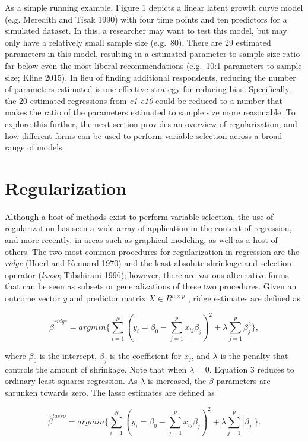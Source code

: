 As a simple running example, Figure 1 depicts a linear latent growth
curve model (e.g. Meredith and Tisak 1990) with four time points and ten
predictors for a simulated dataset. In this, a researcher may want to
test this model, but may only have a relatively small sample size
(e.g.~80). There are 29 estimated parameters in this model, resulting in
a estimated parameter to sample size ratio far below even the most
liberal recommendations (e.g.~10:1 parameters to sample size; Kline
2015). In lieu of finding additional respondents, reducing the number of
parameters estimated is one effective strategy for reducing bias.
Specifically, the 20 estimated regressions from \textit{c1-c10} could be
reduced to a number that makes the ratio of the parameters estimated to
sample size more reasonable. To explore this further, the next section
provides an overview of regularization, and how different forms can be
used to perform variable selection across a broad range of models.

\section{Regularization}\label{regularization}

Although a host of methods exist to perform variable selection, the use
of regularization has seen a wide array of application in the context of
regression, and more recently, in areas such as graphical modeling, as
well as a host of others. The two most common procedures for
regularization in regression are the \textit{ridge} (Hoerl and Kennard
1970) and the least absolute shrinkage and selection operator
(\textit{lasso}; Tibshirani 1996); however, there are various
alternative forms that can be seen as subsets or generalizations of
these two procedures. Given an outcome vector \textit{y} and predictor
matrix \(X \in {R}^{n \times p}\) , ridge estimates are defined as

\[\tag{1}
\hat{\beta}^{ridge}= argmin \Big\{ \sum_{i=1}^{N} (y_{i} = \beta_{0} - \sum_{j=1}^{p}x_{ij} \beta_{j})^{2}  + \lambda \sum_{j=1}^{p} \beta_{j}^{2}\Big\},
\]

where \(\beta_{0}\) is the intercept, \(\beta_{j}\) is the coefficient
for \(x_{j}\), and \(\lambda\) is the penalty that controls the amount
of shrinkage. Note that when \(\lambda = 0\), Equation 3 reduces to
ordinary least squares regression. As \(\lambda\) is increased, the
\(\beta\) parameters are shrunken towards zero. The lasso estimates are
defined as

\[\tag{2}
\hat{\beta}^{lasso}= argmin \Big\{ \sum_{i=1}^{N} (y_{i} = \beta_{0} - \sum_{j=1}^{p}x_{ij} \beta_{j})^{2}  + \lambda \sum_{j=1}^{p}|\beta_{j}|\Big\}.
\]

